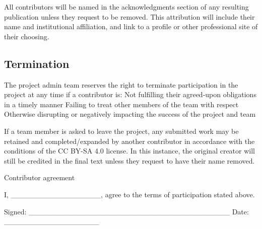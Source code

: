 All contributors will be named in the acknowledgments section of any
resulting publication unless they request to be removed. This
attribution will include their name and institutional affiliation, and
link to a profile or other professional site of their choosing.

\hypertarget{termination}{%
\subsection{Termination}\label{termination}}

The project admin team reserves the right to terminate participation in
the project at any time if a contributor is: Not fulfilling their
agreed-upon obligations in a timely manner Failing to treat other
members of the team with respect Otherwise disrupting or negatively
impacting the success of the project and team

If a team member is asked to leave the project, any submitted work may
be retained and completed/expanded by another contributor in accordance
with the conditions of the CC BY-SA 4.0 license. In this instance, the
original creator will still be credited in the final text unless they
request to have their name removed.

Contributor agreement

I, \_\_\_\_\_\_\_\_\_\_\_\_\_\_\_\_\_, agree to the terms of
participation stated above.

Signed:
\_\_\_\_\_\_\_\_\_\_\_\_\_\_\_\_\_\_\_\_\_\_\_\_\_\_\_\_\_\_\_\_\_\_\_\_\_\_
Date: \_\_\_\_\_\_\_\_\_\_\_\_\_\_\_\_\_\_
